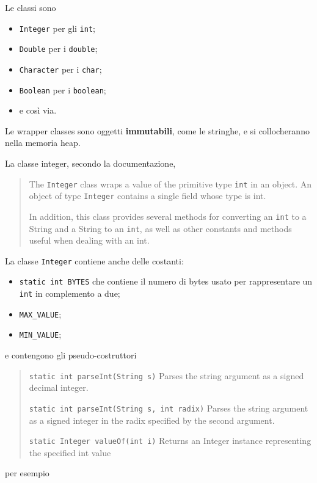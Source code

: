 \documentclass[\fontsizeclass,twocolumn]{\classname}
\theoremstyle{definition}
\theoremstyle{definition}
\begin{document}
Le classi sono
\begin{itemize}
    \item \texttt{Integer} per gli \texttt{int};
    \item \texttt{Double} per i \texttt{double};
    \item \texttt{Character} per i \texttt{char};
    \item \texttt{Boolean} per i \texttt{boolean};
    \item e così via.
\end{itemize}

Le wrapper classes sono oggetti \textbf{immutabili}, come le stringhe, e si
collocheranno nella memoria heap.

La classe integer, secondo la documentazione,
\begin{quote}
    \footnotesize{The \texttt{Integer} class wraps a value of the primitive type \texttt{int} in an object. An object of type \texttt{Integer} contains a single field whose type is int.

In addition, this class provides several methods for converting an \texttt{int} to a String and a String to an \texttt{int}, as well as other constants and methods useful when dealing with an int.
}
\end{quote}

La classe \texttt{Integer} contiene anche delle costanti:
\begin{itemize}
    \item \texttt{static int BYTES} che contiene il numero di bytes usato per
        rappresentare un \texttt{int} in complemento a due;
    \item \texttt{MAX\_VALUE};
    \item \texttt{MIN\_VALUE};
\end{itemize}

e contengono gli pseudo-costruttori 

\begin{quote}
    \footnotesize{\texttt{static int parseInt(String s)} Parses the string argument as a signed decimal integer.

        \texttt{static int parseInt(String s, int radix)} Parses the string argument as a signed integer in the radix specified by the second argument.

    \texttt{static Integer valueOf(int i)} Returns an Integer instance representing the specified int value}
\end{quote}

per esempio
\end{document}
